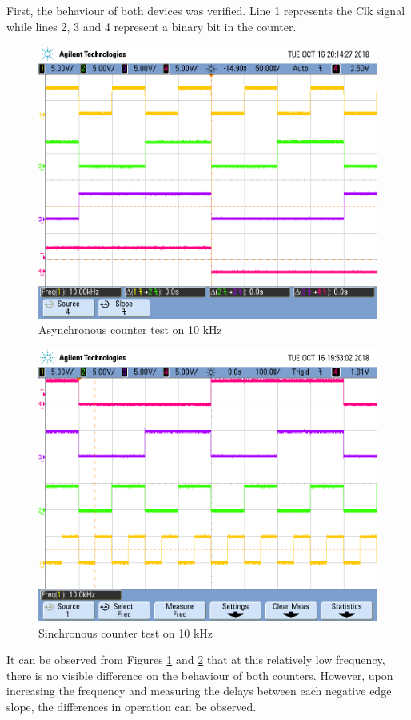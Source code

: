     First, the behaviour of both devices was verified. Line 1 represents the Clk signal while lines 2, 3 and
    4 represent a binary bit in the counter.
    \begin{figure}[h!]
        \begin{center}
            \includegraphics[width=0.6\linewidth]{../Exercise7/latex/images/e3_e7_async0.png}
            \caption{\color{cyan}Asynchronous counter test on 10 kHz}
            \label{fig:e7asynctest1}
        \end{center}
    \end{figure}

    \begin{figure}[h!]
        \begin{center}
            \includegraphics[width=0.6\linewidth]{../Exercise7/latex/images/e3_e7_sync4.png}
            \caption{\color{cyan}Sinchronous counter test on 10 kHz}
            \label{fig:e7synctest1}
        \end{center}
    \end{figure}

    It can be observed from Figures \ref{fig:e7asynctest1} and \ref{fig:e7synctest1} that at this relatively low frequency, there is no visible difference on
    the behaviour of both counters. However, upon increasing the frequency and measuring the delays
    between each negative edge slope, the differences in operation can be observed.

